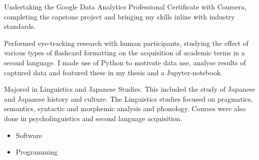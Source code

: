 \documentclass[10pt,a4paper,ragged2e,withhyper]{altacv}
\begin{document}
\begin{paracol}{2}
{}
\label{sec:orgaa5b6da}
Undertaking the Google Data Analytics Professional Certificate with Coursera, completing the capstone project and bringing my skills inline with industry standards.
\par\divider
{}
Performed eye-tracking research with human participants, studying the effect of various types of flashcard formatting on the acquisition of academic terms in a second language. I made use of Python to motivate data use, analyse results of captured data and featured these in my thesis and a Jupyter-notebook.
\par\divider
{}
Majored in Linguistics and Japanese Studies. This included the study of Japanese and Japanese history and culture. The Linguistics studies focused on pragmatics, semantics, syntactic and morphemic analysis and phonology. Courses were also done in psycholinguistics and second language acquisition.

\label{sec:org1052e65}
\begin{itemize}
\item Software
\end{itemize}
\begin{itemize}
\item Programming
\end{itemize}
\cvtag{\LaTeX}

\end{paracol}
\end{document}

